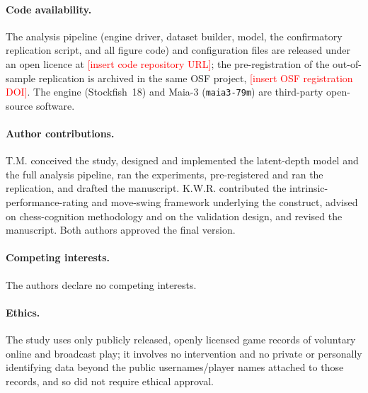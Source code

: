 \documentclass[11pt]{article}
\newcommand{\todo}[1]{\textcolor{red}{[#1]}}
\begin{document}
\paragraph{Code availability.} The analysis pipeline (engine driver, dataset builder, model,
the confirmatory replication script, and all figure code) and configuration files are released
under an open licence at \todo{insert code repository URL}; the pre-registration of the
out-of-sample replication is archived in the same OSF project, \todo{insert OSF registration DOI}.
The engine (Stockfish~18) and Maia-3 (\texttt{maia3-79m}) are third-party open-source software.

\paragraph{Author contributions.} T.M. conceived the study, designed and implemented the
latent-depth model and the full analysis pipeline, ran the experiments, pre-registered and ran
the replication, and drafted the manuscript. K.W.R. contributed the intrinsic-performance-rating
and move-swing framework underlying the construct, advised on chess-cognition methodology and on
the validation design, and revised the manuscript. Both authors approved the final version.

\paragraph{Competing interests.} The authors declare no competing interests.

\paragraph{Ethics.} The study uses only publicly released, openly licensed game records of
voluntary online and broadcast play; it involves no intervention and no private or personally
identifying data beyond the public usernames/player names attached to those records, and so
did not require ethical approval.
\end{document}
